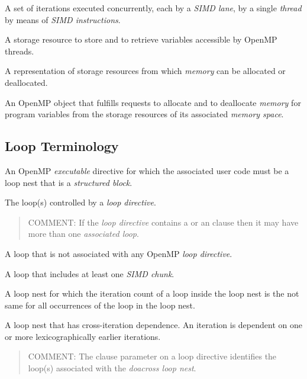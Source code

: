 \glossarydefstart
A set of iterations executed concurrently, each by a \emph{SIMD lane}, by a single \emph{thread}
by means of \emph{SIMD instructions}.
\glossarydefend

\glossarydefstart
A storage resource to store and to retrieve variables accessible by OpenMP threads.
\glossarydefend

\glossarydefstart
A representation of storage resources from which \emph{memory} can be allocated or deallocated.
\glossarydefend

\glossarydefstart
An OpenMP object that fulfills requests to allocate and to deallocate \emph{memory} for program variables from the storage resources of its associated \emph{memory space}.
\glossarydefend

%
%
% 
\subsection{Loop Terminology}
\label{subsec:Loop Terminology}
\glossarydefstart
An OpenMP \emph{executable} directive for which the associated user code must be a loop nest that is a \emph{structured block}.
\glossarydefend

\glossarydefstart
The loop(s) controlled by a \emph{loop directive}.
\begin{quote}
COMMENT: If the \emph{loop directive} contains a  or an \code{)} clause then it may have more than one \emph{associated loop}.
\end{quote}
\glossarydefend

\glossarydefstart
A loop that is not associated with any OpenMP \emph{loop directive}.
\glossarydefend

\glossarydefstart
A loop that includes at least one \emph{SIMD chunk}.
\glossarydefend

\glossarydefstart
A loop nest for which the iteration count of a loop inside the loop nest is the
not same for all occurrences of the loop in the loop nest.
\glossarydefend

\glossarydefstart
A loop nest that has cross-iteration dependence. An iteration is dependent on one or more lexicographically earlier iterations.
\begin{quote}
COMMENT: The  clause parameter on a loop directive identifies the loop(s) associated with the \emph{doacross loop nest}.
\end{quote}
\glossarydefend

